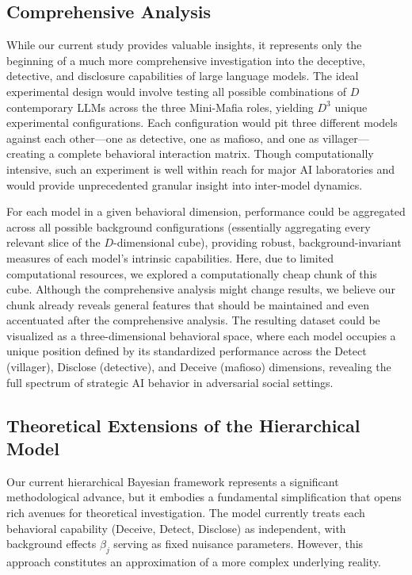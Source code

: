 \documentclass{article}
\begin{document}
\subsection{Comprehensive Analysis}

While our current study provides valuable insights, it represents only the beginning of a much more comprehensive investigation into the deceptive, detective, and disclosure capabilities of large language models. The ideal experimental design would involve testing all possible combinations of $D$ contemporary LLMs across the three Mini-Mafia roles, yielding $D^3$ unique experimental configurations. Each configuration would pit three different models against each other—one as detective, one as mafioso, and one as villager—creating a complete behavioral interaction matrix. Though computationally intensive, such an experiment is well within reach for major AI laboratories and would provide unprecedented granular insight into inter-model dynamics.

For each model in a given behavioral dimension, performance could be aggregated across all possible background configurations (essentially aggregating every relevant slice of the $D$-dimensional cube), providing robust, background-invariant measures of each model's intrinsic capabilities. Here, due to limited computational resources, we explored a computationally cheap chunk of this cube. Although the comprehensive analysis might change results, we believe our chunk already reveals general features that should be maintained and even accentuated after the comprehensive analysis. The resulting dataset could be visualized as a three-dimensional behavioral space, where each model occupies a unique position defined by its standardized performance across the Detect (villager), Disclose (detective), and Deceive (mafioso) dimensions, revealing the full spectrum of strategic AI behavior in adversarial social settings.


\subsection{Theoretical Extensions of the Hierarchical Model}

Our current hierarchical Bayesian framework represents a significant methodological advance, but it embodies a fundamental simplification that opens rich avenues for theoretical investigation. The model currently treats each behavioral capability (Deceive, Detect, Disclose) as independent, with background effects $\beta_j$ serving as fixed nuisance parameters. However, this approach constitutes an approximation of a more complex underlying reality.
\end{document}
